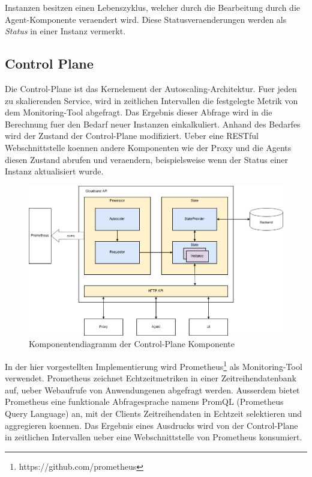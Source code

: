 \documentclass[runningheads]{llncs}
\begin{document}
Instanzen besitzen einen Lebenszyklus, welcher durch die Bearbeitung durch die Agent-Komponente veraendert wird. Diese Statusveraenderungen werden als \textit{Status} in einer Instanz vermerkt.
	
\subsection{Control Plane} \label{control_plane}

Die Control-Plane ist das Kernelement der Autoscaling-Architektur. Fuer jeden zu skalierenden Service, wird in zeitlichen Intervallen die festgelegte Metrik von dem Monitoring-Tool abgefragt. Das Ergebnis dieser Abfrage wird in die Berechnung fuer den Bedarf neuer Instanzen einkalkuliert. Anhand des Bedarfes wird der Zustand der Control-Plane modifiziert. Ueber eine RESTful Webschnittstelle koennen andere Komponenten wie der Proxy und die Agents diesen Zustand abrufen und veraendern, beispielsweise wenn der Status einer Instanz aktualisiert wurde.

\begin{figure}[h]
	\centering
	\includegraphics[width=0.8\linewidth,scale=0.8]{images/autoscaler.png}
	\caption{Komponentendiagramm der Control-Plane Komponente}
\end{figure}

In der hier vorgestellten Implementierung wird Prometheus\footnote{https://github.com/prometheus} als Monitoring-Tool verwendet.  Prometheus zeichnet Echtzeitmetriken in einer Zeitreihendatenbank auf, ueber Webaufrufe von Anwendungenen abgefragt werden. Ausserdem bietet Prometheus eine funktionale Abfragesprache namens PromQL (Prometheus Query Language) an, mit der Clients Zeitreihendaten in Echtzeit selektieren und aggregieren koennen. Das Ergebnis eines Ausdrucks wird von der Control-Plane in zeitlichen Intervallen ueber eine Webschnittstelle von Prometheus konsumiert. \\
\end{document}
